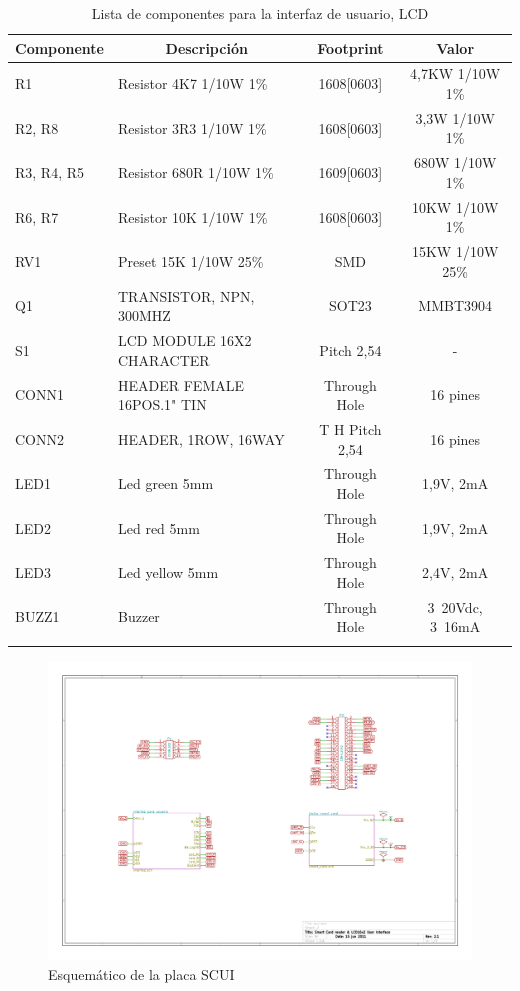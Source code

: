 \newpage
\begin{longtable}{|l|l|c|c|}
\hline
\multicolumn{1}{|c|}{\textbf{Componente}} & \multicolumn{1}{c|}{\textbf{Descripción}} & \textbf{ Footprint} & \textbf{Valor} \\ \hline
R1 & Resistor 4K7    1/10W     1\% & 1608[0603] & 4,7KW  1/10W   1\% \\ \hline
R2, R8 & Resistor 3R3    1/10W     1\% & 1608[0603] & 3,3W    1/10W   1\% \\ \hline
R3, R4, R5 & Resistor 680R  1/10W     1\% & 1609[0603] & 680W   1/10W   1\% \\ \hline
R6, R7 & Resistor 10K    1/10W     1\% & 1608[0603] & 10KW  1/10W   1\% \\ \hline
RV1 & Preset 15K        1/10W  25\% & SMD & 15KW   1/10W  25\% \\ \hline
Q1 & TRANSISTOR, NPN, 300MHZ & SOT23 & MMBT3904 \\ \hline
S1 & LCD MODULE 16X2 CHARACTER & Pitch 2,54 & - \\ \hline
CONN1 & HEADER FEMALE 16POS.1" TIN & Through Hole & 16 pines \\ \hline
CONN2 & HEADER, 1ROW, 16WAY & T H Pitch 2,54 & 16 pines \\ \hline
LED1 & Led green 5mm & Through Hole & 1,9V,  2mA \\ \hline
LED2 & Led red 5mm & Through Hole & 1,9V,  2mA \\ \hline
LED3 & Led yellow 5mm & Through Hole & 2,4V,  2mA \\ \hline
BUZZ1 & Buzzer & Through Hole & 3~20Vdc, 3~16mA \\ \hline
\caption{Lista de componentes para la interfaz de usuario, LCD}
\label{}
\end{longtable}

\begin{figure}[H]
\centering
  \begin{center}
   \includegraphics[angle=90]{Imagenes/scui.jpg}
  \end{center}
  \caption{Esquemático de la placa SCUI}\label{Fig:SCUI} 
\end{figure}

